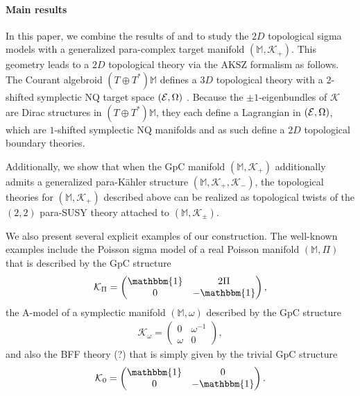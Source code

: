 \documentclass[letterpaper,12pt]{article}
\newcommand{\TT}{{T\oplus T^*}}
\newcommand{\KK}{\mathcal{K}}
\newcommand{\id}{\mathbbm{1}}
\newcommand{\Mb}{\mathbb{M}}
\theoremstyle{definition}
\theoremstyle{remark}
\theoremstyle{examples}
\begin{document}
\paragraph{Main results} In this paper, we combine the results of \cite{HullTwistedSUSY} and \cite{Hu:2019zro} to study the $2D$ topological sigma models with a generalized para-complex target manifold $(\Mb,\KK_+)$. This geometry leads to a $2D$ topological theory via the AKSZ formalism as follows. The Courant algebroid $(\TT)\Mb$ defines a $3D$ topological theory with a $2$-shifted symplectic NQ target space $({\cal E},\Omega)$ \cite{Roytenberg:2002nu}. Because the $\pm 1$-eigenbundles of $\KK$ are Dirac structures in $(\TT)\Mb$, they each define a Lagrangian in $({\cal E},\Omega)$, which are $1$-shifted symplectic NQ manifolds and as such define a $2D$ topological boundary theories.

Additionally, we show that when the GpC manifold $(\Mb,\KK_+)$ additionally admits a generalized para-K\"ahler structure $(\Mb,\KK_+,\KK_-)$, the topological theories for $(\Mb,\KK_+)$ described above can be realized as topological twists of the $(2,2)$ para-SUSY theory attached to $(\Mb,\KK_\pm)$.

We also present several explicit examples of our construction. The well-known examples include the Poisson sigma model of a real Poisson manifold $(\Mb,\Pi)$ that is described by the GpC structure
\begin{align*}
\KK_\Pi=
\begin{pmatrix}
\id & 2\Pi \\
0 & -\id
\end{pmatrix},
\end{align*}
the A-model of a symplectic manifold $(\Mb,\omega)$ described by the GpC structure
\begin{align*}
\KK_\omega=
\begin{pmatrix}
0 & \omega^{-1} \\
\omega & 0
\end{pmatrix},
\end{align*}
and also the BFF theory (?) that is simply given by the trivial GpC structure
\begin{align*}
\KK_0=
\begin{pmatrix}
\id & 0 \\
0 & -\id
\end{pmatrix}.
\end{align*}
\end{document}
